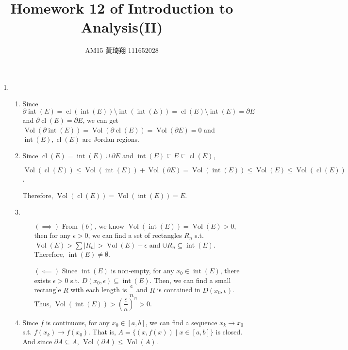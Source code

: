 \documentclass[12pt]{article}
\title{Homework 12 of Introduction to Analysis(II)}
\author{AM15 黃琦翔 111652028}
\DeclareMathOperator{\volume}{Vol}
\DeclareMathOperator{\interior}{int}
\DeclareMathOperator{\closure}{cl}
\newcommand{\boundary}{\partial}
\begin{document}
\maketitle
\begin{enumerate}
    \item \begin{enumerate}
        \item Since  $\boundary \interior(E) = \closure(\interior(E)) \setminus \interior(\interior(E)) = \closure(E) \setminus \interior(E) = \boundary E$ and $\boundary \closure(E) = \boundary E$,
        we can get $\volume(\boundary\interior(E)) = \volume(\boundary\closure(E)) = \volume(\boundary E) = 0$ and $\interior(E), \closure(E)$ are Jordan regions.

        \item Since $\closure(E) = \interior(E) \cup \boundary E$ and $\interior(E)\subseteq E \subseteq \closure(E)$,

        $\volume(\closure(E)) \leq \volume(\interior(E)) + \volume(\boundary E) = \volume(\interior(E))\leq \volume(E) \leq \volume(\closure(E))$.

        Therefore, $\volume(\closure(E)) = \volume(\interior(E)) = E$.

        \item $\ $
        \begin{enumerate}
            \item[$(\implies)$] From $(b)$, we know $\volume(\interior(E)) = \volume(E) > 0$, 
            then for any $\epsilon > 0$, we can find a set of rectangles $R_n$ s.t. $\volume(E) > \sum |R_n| > \volume(E) - \epsilon$ and $\cup R_n \subseteq \interior(E)$.
            Therefore, $\interior(E) \neq \emptyset$.

            \item[$(\impliedby)$] Since $\interior(E)$ is non-empty, for any $x_0\in \interior(E)$, there exists $\epsilon > 0$ s.t. $D(x_0, \epsilon) \subseteq \interior(E)$.
            Then, we can find a small rectangle $R$ with each length is $\dfrac{\epsilon}{n}$ and $R$ is contained in $D(x_0, \epsilon)$.
            Thus, $\volume(\interior(E)) > \left(\dfrac{\epsilon}{n}\right)^n > 0$.
        \end{enumerate}

        \item Since $f$ is continuous, for any $x_0 \in [a, b]$, we can find a sequence $x_k \to x_0$ s.t. $f(x_k) \to f(x_0)$.
        That is, $A = \{(x, f(x)) \mid x\in [a, b]\}$ is closed.
        And since $\boundary A \subseteq A$, $\volume(\boundary A) \leq \volume(A)$.
        

\end{enumerate}
\end{enumerate}
\end{document}
